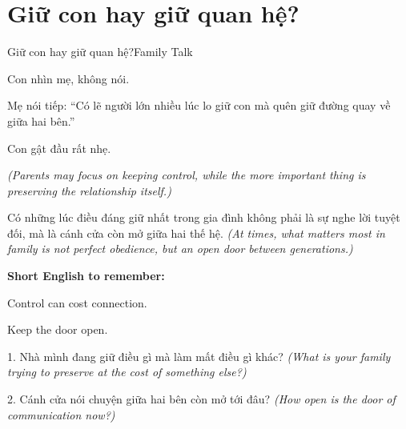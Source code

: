 \section{Giữ con hay giữ quan hệ?}
\begin{truyen}{Giữ con hay giữ quan hệ?}{Family Talk}

Con nhìn mẹ, không nói.

Mẹ nói tiếp: ``Có lẽ người lớn nhiều lúc lo giữ con mà quên giữ đường quay về giữa hai bên.''

Con gật đầu rất nhẹ.

\textit{(Parents may focus on keeping control, while the more important thing is preserving the relationship itself.)}
\end{truyen}

\begin{baihoc}
Có những lúc điều đáng giữ nhất trong gia đình không phải là sự nghe lời tuyệt đối, mà là cánh cửa còn mở giữa hai thế hệ.
\textit{(At times, what matters most in family is not perfect obedience, but an open door between generations.)}
\end{baihoc}

\begin{ghinhoanh}
\textbf{Short English to remember:}

Control can cost connection.

Keep the door open.
\end{ghinhoanh}

\begin{tuhocnhanh}
1. Nhà mình đang giữ điều gì mà làm mất điều gì khác? \textit{(What is your family trying to preserve at the cost of something else?)}

2. Cánh cửa nói chuyện giữa hai bên còn mở tới đâu? \textit{(How open is the door of communication now?)}
\end{tuhocnhanh}
\ngancach